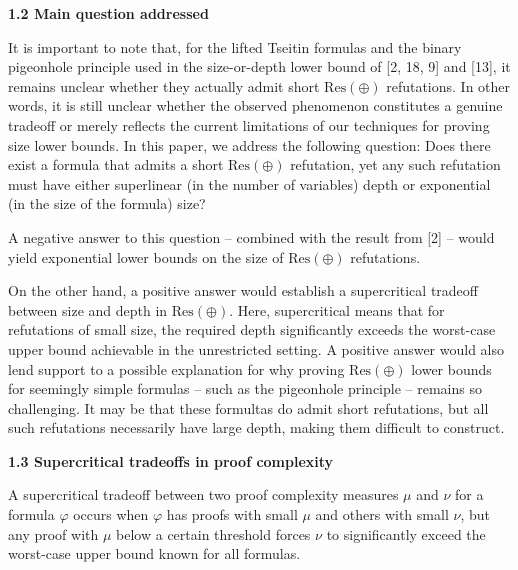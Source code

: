 \documentclass[10pt,a4paper]{article}
\begin{document}
\par\medskip\noindent\textbf{
1.2 Main question addressed}\par


It is important to note that, for the lifted Tseitin formulas and the binary pigeonhole principle used in the size-or-depth lower bound of [2, 18, 9] and [13],
it remains unclear whether they actually admit short $\mathrm{Res}(\oplus)$ refutations.
In other words, it is still unclear whether the observed phenomenon constitutes a genuine tradeoff or merely reflects
the current limitations of our techniques for proving size lower bounds.
In this paper, we address the following question: Does there exist a formula that admits a
short $\mathrm{Res}(\oplus)$ refutation, yet any such refutation must have either superlinear
(in the number of variables) depth or exponential (in the size of the formula) size?\par



A negative answer to this question – combined with the result from [2] –
would yield exponential lower bounds on the size of $\operatorname{\mathrm{Res}(\oplus)}$ refutations.\par



On the other hand, a positive answer would establish a supercritical tradeoff
between size and depth in $\operatorname{\mathrm{Res}(\oplus)}$.
Here, supercritical means that for refutations of small size, the required depth
significantly exceeds the worst-case upper bound achievable in the unrestricted setting.
A positive answer would also lend support to a possible explanation for why proving
$\mathrm{Res}(\oplus)$ lower bounds for seemingly simple formulas – such as the pigeonhole
principle – remains so challenging.
It may be that these formultas do admit short refutations, but all such refutations
necessarily have large depth, making them difficult to construct.\par


\par\medskip\noindent\textbf{
1.3 Supercritical tradeoffs in proof complexity}\par


A supercritical tradeoff between two proof complexity measures $\mu$ and $\nu$ for a formula
$\varphi$ occurs when $\varphi$ has proofs with small $\mu$ and others with small $\nu$,
but any proof with $\mu$ below a certain threshold forces $\nu$ to significantly exceed
the worst-case upper bound known for all formulas.\par
\end{document}
